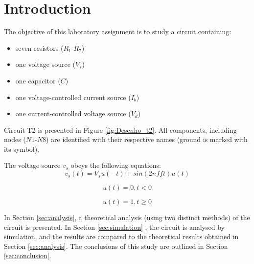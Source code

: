 
\section{Introduction}
\label{sec:introduction}


The objective of this laboratory assignment is to study a circuit containing:
\begin{itemize}
	\item seven resistors ($R_1$-$R_7$)
	\item one voltage source ($V_s$)
	\item one capacitor ($C$)
	\item one voltage-controlled current source ($I_b$)
	\item one current-controlled voltage source ($V_d$)
\end{itemize}


Circuit T2 is presented in Figure \ref{fig:Desenho_t2}. All components, including nodes
($N1$-$N8$) are identified with their respective names (ground is marked with its symbol).

The voltage source $v_s$ obeys the following equations:
\begin{equation}
	v_s(t) = V_su(-t) + sin(2nfft)u(t)
\end{equation}

\begin{equation}
	u(t) = 0, t < 0
\end{equation}

\begin{equation}
	u(t) = 1, t \geq 0
\end{equation}


In Section \ref{sec:analysis}, a theoretical analysis (using two distinct methods) of
the circuit is presented. In Section \ref{sec:simulation} , the circuit is analysed by
simulation, and the results are compared to the theoretical results obtained in Section
\ref{sec:analysis}. The conclusions of this study are outlined in Section \ref{sec:conclusion}.


